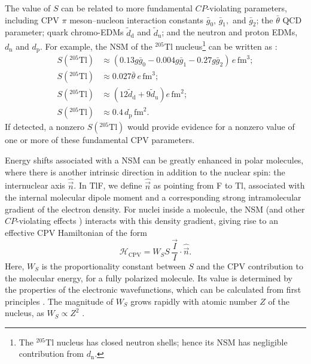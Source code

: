 The value of $S$ can be related to more fundamental $CP$-violating parameters, including CPV $\pi$ meson--nucleon interaction constants $\bar{g}_{0},\,\bar{g}_1,$ and $\bar{g}_2$; the $\bar{\theta}$ QCD parameter; quark chromo-EDMs $\widetilde{d}_\text{d}$ and $\widetilde{d}_\text{u}$; and the neutron and proton EDMs, $d_\text{n}$ and $d_\text{p}$.  For example, the NSM of the $^{205}\mathrm{Tl}$ nucleus\footnote{The $^{205}\mathrm{Tl}$ nucleus has closed neutron shells; hence its NSM has negligible contribution from $d_\text{n}$.}  can be written as \cite{PhysRevA.101.042504,PhysRevA.101.042501}:
\begin{equation} 
    \label{eq:schiff_contributions}
        \begin{split}
            S\left(^{205}\mathrm{Tl}\right) & \approx \left(0.13g\bar{g}_0 - 0.004g\bar{g}_1 - 0.27 g \bar{g}_2\right) \,e\,\mathrm{fm}^3; \\
            S\left(^{205}\mathrm{Tl}\right) & \approx 0.027 \bar{\theta}\ e\,\mathrm{fm}^3; \\
            S\left(^{205}\mathrm{Tl}\right) & \approx \left(12\widetilde{d}_\text{d}+9\widetilde{d}_\text{u}\right) e\,\mathrm{fm}^2; \\
            S\left(^{205}\mathrm{Tl}\right) & \approx 0.4\,d_\text{p} \,\mathrm{fm}^2.
    \end{split}
\end{equation}
If detected, a nonzero $S\left(^{205}\mathrm{Tl}\right)$ would provide evidence for a nonzero value of one or more of these fundamental CPV parameters.

Energy shifts associated with a NSM can be greatly enhanced in polar molecules, where there is another intrinsic direction in addition to the nuclear spin: the internuclear axis $\hat{\vec{n}}$. In TlF,  we define $\hat{\vec{n}}$ as pointing from F to Tl, associated with the internal molecular dipole moment and a corresponding strong intramolecular gradient of the electron density.  For nuclei inside a molecule, the NSM (and other $CP$-violating effects \cite{khriplovich1997}) interacts with this density gradient, giving rise to an effective CPV Hamiltonian of the form \cite{PhysRevA.101.042504}
\begin{equation}\label{eq:Hamiltonian_effective_interaction}
    \mathcal{H}_\text{CPV}= W_S S\,\frac{\vec{I}}{I} \cdot \hat{\vec{n}}.
\end{equation}
Here, $W_S$ is the proportionality constant between $S$ and the CPV contribution to the molecular energy, for a fully polarized molecule. Its value is determined by the properties of the electronic wavefunctions, which can be calculated from first principles \cite{PhysRevA.101.042504, doi:10.1002/qua.20418, PhysRevLett.88.073001, doi:10.1080/00268976.2020.1767814}. The magnitude of $W_S$ grows rapidly with atomic number $Z$ of the nucleus, as $W_S\propto Z^2$ \cite{khriplovich1991parity}.

